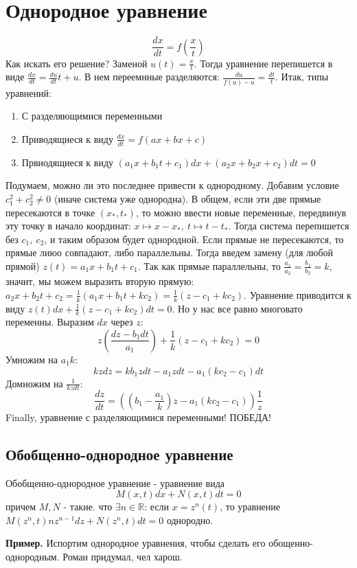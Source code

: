 \section{Однородное уравнение}
$$\frac{dx}{dt}=f\left(\frac{x}{t}\right)$$ 
Как искать его решение? Заменой $u(t)=\frac{x}{t}$. 
Тогда уравнение перепишется в виде $\frac{dx}{dt}=\frac{du}{dt}t+u$.
В нем переемнные разделяются: $\frac{du}{f(u)-u}=\frac{dt}{t}$. 
Итак, типы уравнений:
\begin{enumerate}
    \item С разделяющимися переменными
    \item Приводящиеся к виду $\frac{dx}{dt}=f(ax+bx+c)$ 
    \item Првиодящиеся к виду $(a_1x+b_1t+c_1)dx+(a_2x+b_2x+c_2)dt=0$
\end{enumerate}
Подумаем, можно ли это последнее привести к однородному. Добавим условие 
$c_1^2+c_2^2\ne0$ (иначе система уже однородна). В общем, если эти 
две прямые пересекаются в точке
$(x_*,t_*)$, то можно ввести новые переменные, передвинув эту точку в начало
координат: $x\mapsto x-x_*,~t\mapsto t-t_*$. Тогда система перепишется 
без $c_1,~c_2$, и таким образом будет однородной. Если прямые не пересекаются, 
то прямые лиюо совпадают, либо параллельны. Тогда введем замену (для любой 
прямой) $z(t)=a_1x+b_1t+c_1$. Так как прямые параллельны, то
$\frac{a_1}{a_2}=\frac{b_1}{b_2}=k$, значит, мы можем выразить 
вторую прямую: $a_2x+b_2t+c_2=\frac{1}{k}(a_1x+b_1t+kc_2)=\frac{1}{k}(z-
c_1+kc_2)$. Уравнение приводится к виду $z(t)dx+\frac{1}{k}(z-c_1+kc_2)dt=0$.
Но у нас все равно многовато переменны. Выразим $dx$ через  $z$:
$$z(\frac{dz-b_1dt}{a_1})+\frac{1}{k}(z-c_1+kc_2)=0$$ 
Умножим на $a_1k$:
 $$kzdz=kb_1zdt-a_1zdt-a_1(kc_2-c_1)dt$$ 
Домножим на $\frac{1}{kzdt}$:
$$\frac{dz}{dt}=((b_1-\frac{a_1}{k})z-a_1(kc_2-c_1))\frac{1}{z}$$ 
Finally, уравнение с разделяющимися переменными! ПОБЕДА!
\subsection{Обобщенно-однородное уравнение}
\begin{defin}
Обобщенно-однородное уравнение - уравнение вида
$$M(x,t)dx+N(x,t)dt=0$$ 
причем $M,N$ - такие. что  $\exists n\in\mathbb{R}$: если
$x=z^n(t)$, то уравнение  $M(z^n,t)nz^{n-1}dz+N(z^n,t)dt=0$ однородно.
\end{defin}
\textbf{Пример.} Испортим однородное уравнения, чтобы сделать его 
обощенно-однородным. Роман придумал, чел харош.

